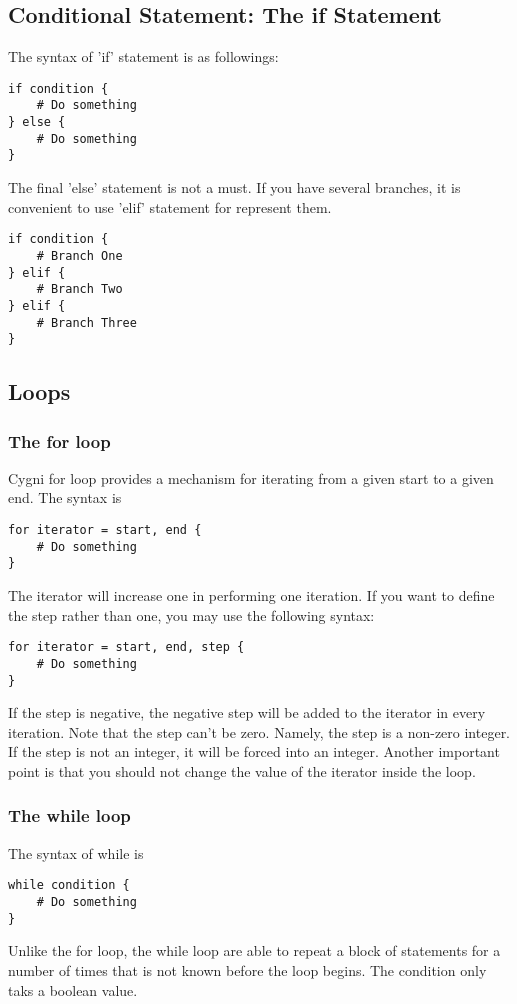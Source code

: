 \subsection{Conditional Statement: The if Statement}
The syntax of 'if' statement is as followings:
\begin{lstlisting}
if condition {
	# Do something
} else {
	# Do something
}
\end{lstlisting}
The final 'else' statement is not a must. If you have several branches, it is convenient to use 'elif' statement for represent them. 
\begin{lstlisting}
if condition {
	# Branch One 
} elif {
	# Branch Two 
} elif {
	# Branch Three
} 
\end{lstlisting}

\subsection{Loops}
\subsubsection{The for loop} 
Cygni for loop provides a mechanism for iterating from a given start to a given end. The syntax is
\begin{lstlisting}
for iterator = start, end {
	# Do something
}
\end{lstlisting}
The iterator will increase one in performing one iteration. If you want to define the step rather than one, you may use the following syntax:
\begin{lstlisting}
for iterator = start, end, step {
	# Do something
}
\end{lstlisting}
If the step is negative, the negative step will be added to the iterator in every iteration. Note that the step can't be zero. Namely, the step is a non-zero integer. If the step is not an integer, it will be forced into an integer. Another important point is that you should not change the value of the iterator inside the loop.

\subsubsection{The while loop}
The syntax of while is
\begin{lstlisting}
while condition {
	# Do something
}
\end{lstlisting}
Unlike the for loop, the while loop are able to repeat a block of statements for a number of times that is not known before the loop begins. The condition only taks a boolean value.
